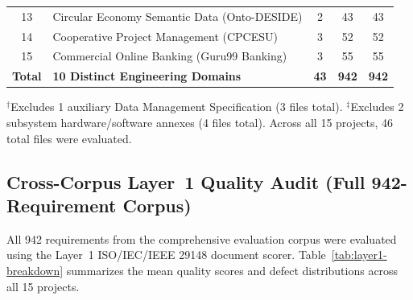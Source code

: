 \documentclass[journal]{IEEEtran}
\begin{document}
\begin{table}[htbp]
\begin{tabularx}{\columnwidth}{@{}c>{\raggedright\arraybackslash}Xccc@{}}
13 & Circular Economy Semantic Data (Onto-DESIDE)   & 2 & 43  & 43  \\
14 & Cooperative Project Management (CPCESU)        & 3 & 52  & 52  \\
15 & Commercial Online Banking (Guru99 Banking)     & 3 & 55  & 55  \\
\midrule
\textbf{Total} & \textbf{10 Distinct Engineering Domains} & \textbf{43} & \textbf{942} & \textbf{942} \\
\bottomrule
\end{tabularx}
\vspace{1ex}
\raggedright\footnotesize
$^\dagger$Excludes 1 auxiliary Data Management Specification (3 files total). $^\ddagger$Excludes 2 subsystem hardware/software annexes (4 files total). Across all 15 projects, 46 total files were evaluated.
\end{table}

\subsection{Cross-Corpus Layer~1 Quality Audit (Full 942-Requirement Corpus)}
\label{sec:layer1-sweep}

All 942 requirements from the comprehensive evaluation corpus were evaluated using the Layer~1 ISO/IEC/IEEE 29148 document scorer. Table~\ref{tab:layer1-breakdown} summarizes the mean quality scores and defect distributions across all 15 projects.
\end{document}
